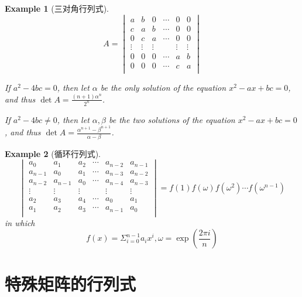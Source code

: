 \documentclass[onecolumn]{ctexart}
\newtheorem{example}{Example}
\begin{document}
\begin{example}[三对角行列式]
\[
  A = 
  \begin{vmatrix}
    a & b & 0 & \cdots & 0 & 0 \\
    c & a & b & \cdots & 0 & 0 \\
    0 & c & a & \cdots & 0 & 0 \\
    \vdots & \vdots & \vdots & & \vdots & \vdots \\
    0 & 0 & 0 & \cdots & a & b \\
    0 & 0 & 0 & \cdots & c & a \\
  \end{vmatrix}
\]

If $a^2 - 4bc = 0$, then let $\alpha$ be the only solution of the equation 
$x^2 - ax + bc = 0$, and thus $\det A = \frac{(n+1)\alpha^n}{2^n}$.

If $a^2 - 4bc \neq 0$, then let $\alpha, \beta$ be the two solutions of the 
equation $x^2 - ax + bc = 0$, and thus $\det A = 
\frac{\alpha^{n+1} - \beta^{n+1}}{\alpha - \beta}$.
\end{example}

\begin{example}[循环行列式]
\[
  \begin{vmatrix}
    a_0 & a_1 & a_2 & \cdots & a_{n-2} & a_{n-1} \\
    a_{n-1} & a_0 & a_1 & \cdots & a_{n-3} & a_{n-2} \\
    a_{n-2} & a_{n-1} & a_0 & \cdots & a_{n-4} & a_{n-3} \\
    \vdots & \vdots & \vdots & & \vdots & \vdots \\
    a_2 & a_3 & a_4 & \cdots & a_0 & a_1 \\
    a_1 & a_2 & a_3 & \cdots & a_{n-1} & a_0 \\
  \end{vmatrix} = f(1)f(\omega)f(\omega^2) \cdots f(\omega^{n-1})
\]
in which
\[
  f(x) = \Sigma_{i=0}^{n-1} a_i x^i, \omega = \exp(\frac{2\pi i}{n})
\]
\end{example}

\section{特殊矩阵的行列式}
\end{document}
